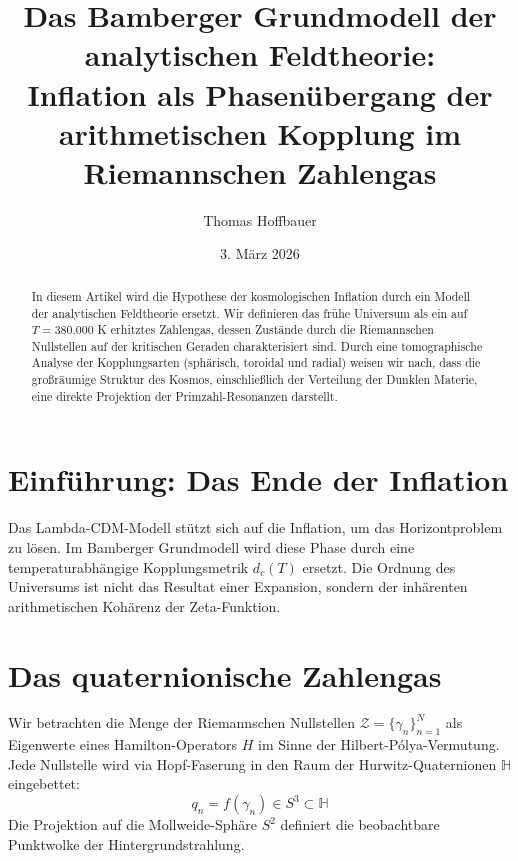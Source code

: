 \documentclass[11pt,a4paper]{article}
\title{Das Bamberger Grundmodell der analytischen Feldtheorie: \\ 
	\large Inflation als Phasenübergang der arithmetischen Kopplung im Riemannschen Zahlengas}
\author{Thomas Hoffbauer}
\date{3. März 2026}
\begin{document}
	
	\maketitle
	
	\begin{abstract}
		In diesem Artikel wird die Hypothese der kosmologischen Inflation durch ein Modell der analytischen Feldtheorie ersetzt. Wir definieren das frühe Universum als ein auf $T = 380.000$ K erhitztes Zahlengas, dessen Zustände durch die Riemannschen Nullstellen auf der kritischen Geraden charakterisiert sind. Durch eine tomographische Analyse der Kopplungsarten (sphärisch, toroidal und radial) weisen wir nach, dass die großräumige Struktur des Kosmos, einschließlich der Verteilung der Dunklen Materie, eine direkte Projektion der Primzahl-Resonanzen darstellt.
	\end{abstract}
	
	\section{Einführung: Das Ende der Inflation}
	Das Lambda-CDM-Modell stützt sich auf die Inflation, um das Horizontproblem zu lösen. Im Bamberger Grundmodell wird diese Phase durch eine temperaturabhängige Kopplungsmetrik $d_c(T)$ ersetzt. Die Ordnung des Universums ist nicht das Resultat einer Expansion, sondern der inhärenten arithmetischen Kohärenz der Zeta-Funktion.
	
	\section{Das quaternionische Zahlengas}
	Wir betrachten die Menge der Riemannschen Nullstellen $\mathcal{Z} = \{\gamma_n\}_{n=1}^N$ als Eigenwerte eines Hamilton-Operators $H$ im Sinne der Hilbert-Pólya-Vermutung. Jede Nullstelle wird via Hopf-Faserung in den Raum der Hurwitz-Quaternionen $\mathbb{H}$ eingebettet:
	\begin{equation}
		q_n = f(\gamma_n) \in S^3 \subset \mathbb{H}
	\end{equation}
	Die Projektion auf die Mollweide-Sphäre $S^2$ definiert die beobachtbare Punktwolke der Hintergrundstrahlung.
	
\end{document}
